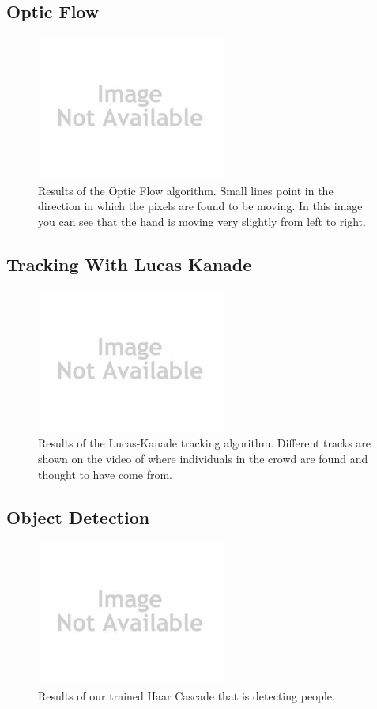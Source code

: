 \documentclass[conference]{IEEEtran}
\begin{document}
\subsection{Optic Flow}

\begin{figure}[!t]
\centering
\includegraphics[width=2.5in]{noImage.jpg}
\caption{Results of the Optic Flow algorithm. Small lines point in the direction in which the pixels are found to be moving. In this image you can see that the hand is moving very slightly from left to right.}
\label{Optic_Flow}
\end{figure}

\subsection{Tracking With Lucas Kanade}

\begin{figure}[!t]
\centering
\includegraphics[width=2.5in]{noImage.jpg}
\caption{Results of the Lucas-Kanade tracking algorithm. Different tracks are shown on the video of where individuals in the crowd are found and thought to have come from.}
\label{Lucas_Kanade}
\end{figure}

\subsection{Object Detection}

\begin{figure}[!t]
\centering
\includegraphics[width=2.5in]{noImage.jpg}
\caption{Results of our trained Haar Cascade that is detecting people.}
\label{Object_Detection}
\end{figure}
\end{document}
